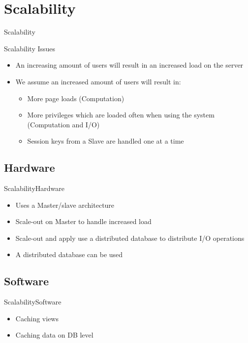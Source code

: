 \section{Scalability}
\begin{frame}{Scalability}{}
\begin{block}{Scalability Issues}
  \begin{itemize}
    \item An increasing amount of users will result in an increased load on the server
    \item We assume an increased amount of users will result in:
    \begin{itemize}
			\item More page loads (Computation)
			\item More privileges which are loaded often when using the system (Computation and I/O)
			\item Session keys from a Slave are handled one at a time
		\end{itemize}
  \end{itemize}
\end{block}
\end{frame}

\subsection{Hardware}
\begin{frame}{Scalability}{Hardware}
  \begin{itemize}
  	\item Uses a Master/slave architecture
    \item Scale-out on Master to handle increased load
    \item Scale-out and apply use a distributed database to distribute I/O operations
    \item A distributed database can be used 
  \end{itemize}
\end{frame}

\subsection{Software}
\begin{frame}{Scalability}{Software}
  \begin{itemize}
    \item Caching views 
    \item Caching data on DB level
  \end{itemize}
\end{frame}

